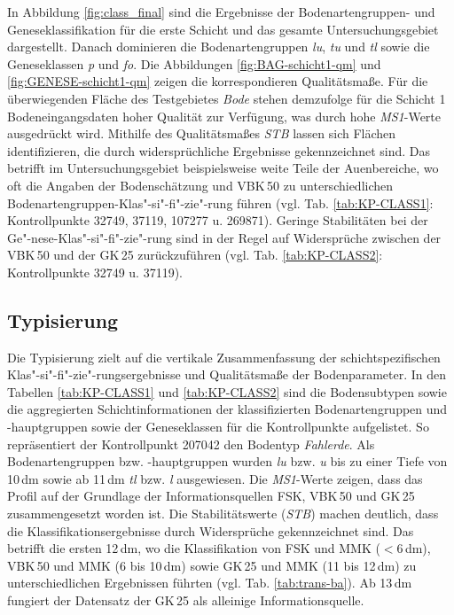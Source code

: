 In Abbildung \ref{fig:class_final} sind die Ergebnisse der Bodenartengruppen- und Geneseklassifikation für die erste Schicht und das gesamte Untersuchungsgebiet dargestellt. Danach dominieren die Bodenartengruppen \textit{lu}, \textit{tu} und \textit{tl} sowie die Geneseklassen \textit{p} und \textit{fo}. Die Abbildungen \ref{fig:BAG-schicht1-qm} und \ref{fig:GENESE-schicht1-qm} zeigen die korrespondieren Qualitätsmaße. Für die überwiegenden Fläche des Testgebietes \textit{Bode} stehen demzufolge für die Schicht 1 Bodeneingangsdaten hoher Qualität zur Verfügung, was durch hohe \textit{MS1}-Werte ausgedrückt wird. Mithilfe des Qualitätsmaßes \textit{STB} lassen sich Flächen identifizieren, die durch widersprüchliche Ergebnisse gekennzeichnet sind. Das betrifft im Untersuchungsgebiet beispielsweise weite Teile der Auenbereiche, wo oft die Angaben der Bodenschätzung und VBK\,50 zu unterschiedlichen Bodenartengruppen-Klas"-si"-fi"-zie"-rung  führen (vgl. Tab. \ref{tab:KP-CLASS1}: Kontrollpunkte 32749, 37119, 107277 u. 269871). Geringe Stabilitäten bei der Ge"-nese-Klas"-si"-fi"-zie"-rung sind in der Regel auf Widersprüche zwischen der VBK\,50 und der GK\,25 zurückzuführen (vgl. Tab. \ref{tab:KP-CLASS2}: Kontrollpunkte 32749 u. 37119).

\subsection{Typisierung}\label{sec:typ}
Die Typisierung zielt auf die vertikale Zusammenfassung der schichtspezifischen Klas"-si"-fi"-zie"-rungsergebnisse und Qualitätsmaße der Bodenparameter. In den Tabellen \ref{tab:KP-CLASS1} und \ref{tab:KP-CLASS2} sind die Bodensubtypen sowie die aggregierten Schichtinformationen der klassifizierten Bodenartengruppen und -hauptgruppen sowie der Geneseklassen für die Kontrollpunkte aufgelistet. So repräsentiert der Kontrollpunkt 207042 den Bodentyp \textit{Fahlerde}.  Als Bodenartengruppen bzw. -hauptgruppen wurden \textit{lu} bzw. \textit{u} bis zu einer Tiefe von 10\,dm sowie ab 11\,dm \textit{tl} bzw. \textit{l} ausgewiesen. Die \textit{MS1}-Werte zeigen, dass das Profil auf der Grundlage der Informationsquellen FSK, VBK\,50 und GK\,25 zusammengesetzt worden ist. Die Stabilitätswerte (\textit{STB}) machen deutlich, dass die Klassifikationsergebnisse durch Widersprüche gekennzeichnet sind.  Das betrifft die ersten 12\,dm, wo die Klassifikation von FSK und MMK ($<6$\,dm), VBK\,50 und MMK (6 bis 10\,dm) sowie GK\,25 und MMK (11 bis 12\,dm) zu unterschiedlichen Ergebnissen führten (vgl. Tab. \ref{tab:trans-ba}). Ab 13\,dm fungiert der Datensatz der GK\,25 als alleinige Informationsquelle.\

